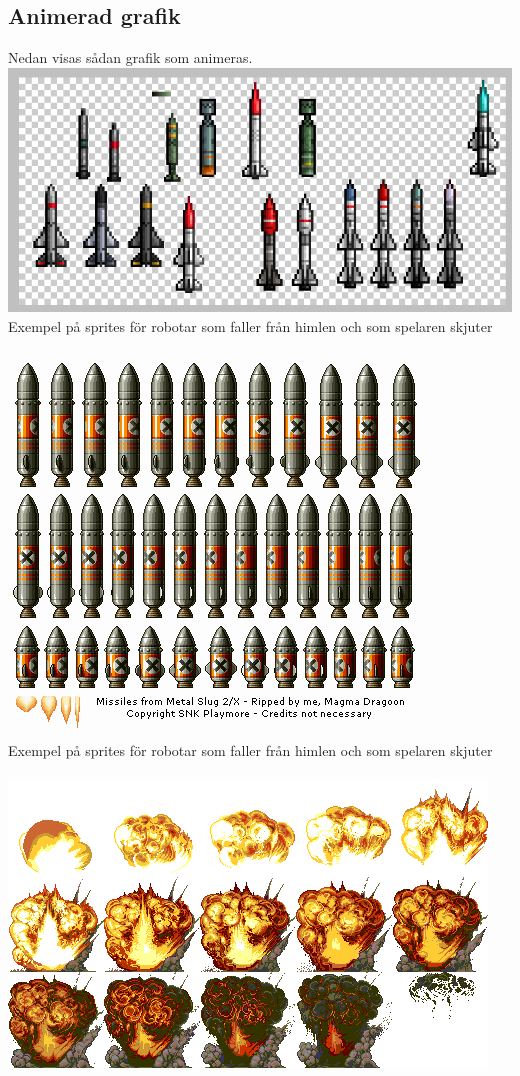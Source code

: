 \documentclass{TDP003mall}
\begin{document}
\newpage

\subsection{Animerad grafik}
Nedan visas sådan grafik som animeras.
\\
\includegraphics*[scale=0.4]{4.png}
\\ Exempel på sprites för robotar som faller från himlen och som spelaren skjuter \\\\
\includegraphics*[scale=0.4]{3.png}
\\ Exempel på sprites för robotar som faller från himlen och som spelaren skjuter \\\\
\includegraphics*[scale=0.4]{2.png}
\end{document}
